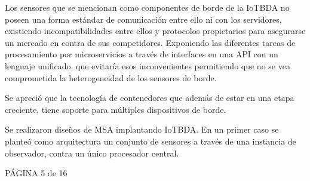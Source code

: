 Los sensores que se mencionan como componentes  de borde de la IoTBDA no poseen una forma estándar de comunicación entre ello ni con los servidores, existiendo incompatibilidades entre ellos y protocolos propietarios para asegurarse un mercado en contra de sus competidores. Exponiendo las diferentes tareas de procesamiento por microservicios a través de  interfaces en una API con un lenguaje unificado, que evitaría esos inconvenientes permitiendo que no se vea comprometida la heterogeneidad de los sensores de borde.

Se apreció que la tecnología de contenedores que además de estar  en una etapa creciente, tiene soporte para múltiples dispositivos de borde.


 Se realizaron diseños de MSA implantando IoTBDA. En un primer caso se planteó como arquitectura un conjunto de sensores a través de una instancia de observador, contra un único procesador central. 
 
 PÁGINA 5 de 16


